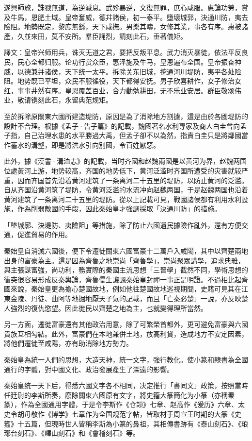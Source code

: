 遂興師旅，誅戮無道，為逆滅息。武殄暴逆，文復無罪，庶心咸服。惠論功勞，賞及牛馬，恩肥土域。皇帝奮威，德幷諸侯，初一泰平。墮壞城郭，決通川防，夷去險阻。地勢既定，黎庶無繇，天下咸撫。男樂其疇，女修其業，事各有序。惠被諸產，久並來田，莫不安所。羣臣誦烈，請刻此石，垂著儀矩。

譯文：皇帝兴师用兵，诛灭无道之君，要把反叛平息。武力消灭暴徒，依法平反良民，民心全都归服。论功行赏众臣，惠泽施及牛马，皇恩遍布全国。皇帝振奋神威，以德兼并诸侯，天下统一太平。拆除关东旧城，挖通河川堤防，夷平各处险阻。地势既已平坦，众民不服徭役，天下都得安抚。男子欣喜耕作，女子修治女红，事事井然有序。皇恩覆盖百业，合力勤勉耕田，无不乐业安居。群臣敬颂伟业，敬请镌刻此石，永留典范规矩。

至於拆除原關東六國所建造堤防，原因是為了消除地方割據，這是由於各國堤防的設計不合理。根據《孟子·告子篇》的記載，魏國著名水利專家及商人白圭曾向孟子指，自己治理水患的水平勝過大禹，但孟子卻不以為然，指責白圭只是將鄰國當作蓄水的溝壑，即是將洪水引向別國，令百姓厭惡。

此外，據《漢書·溝洫志》的記載，当时齐國和赵魏兩國是以黄河为界，赵魏两国位處黃河上游，地势较高，齐国的地势低下，黄河泛滥时齐国所遭受的灾害就较严重，因而齐国首先沿着黄河建筑了一条离河二十五里的堤防，以防止黄河的泛滥。自从齐国沿黄河筑了堤防，令黄河泛滥的水流冲向赵魏两国，于是赵魏两国也沿着黄河建筑了一条离河二十五里的堤防。從以上記載可見，戰國諸侯都有利用水利設施，作為削弱敵國的手段，因此秦始皇才強調採取「決通川防」的措施。

「墜城廓、決堤防、夷險阻」等措施，除了防止六國遺民據險作亂外，還有方便交通，促進貿易的作用。

秦始皇自消滅六國後，便下令遷徙關東六國富豪十二萬戶入咸陽，其中以齊楚兩地出身的富豪為主。這是因為齊魯之地崇尚「齊魯學」，崇尚聚眾講學，追求典雅，與主張謀富強，尚功利，務實際的秦國主流思想「三晉學」截然不同，學術思想的衝突很容易形成反秦輿論，齊魯儒生譏諷秦始皇封禪一事正是明證。不過相比起齊國來說，秦始皇更為擔心楚國故地，例如他往楚國故地巡視期間，史籍可見其在江東金陵、丹徒、曲阿等地掘地厭天子氣的記載，而且「亡秦必楚」一說，亦反映楚人強烈的復仇慾望。因此徙民以齊楚之地為主，也就變得理所當然。

另一方面，遷徙富豪還有其他政治用意，除了可繁榮首都外，更可避免富豪與六國貴族互相勾結。此外，富豪們在本地兼併土地，放高利貸，造成地方不安定因素，將他們遷徙至咸陽，亦有助消除地方勢力。

秦始皇為統一人們的思想，大造天神，統一文字，強行教化。使小篆和隸書為全國通行的字體，對中國文化、政治發展產生了深遠的影響。

秦始皇统一天下后，得悉六國文字各不相同，决定推行「書同文」政策，按照當時任廷尉的李斯所奏，廢除關東六國原有文字，將史籀大篆簡化为小篆（亦稱秦篆），作為全國通用字體，于是令李斯作《仓颉》七章、赵高作《爰历》六章、太史令胡毋敬作《博学》七章作为全国规范字帖，皆取材于周宣王时期的大篆《史籀》十五篇，但現時世人皆稱李斯為小篆的鼻祖，其相傳書跡有《泰山刻石》、《琅琊台刻石》、《嶧山刻石》和《會稽刻石》等。


